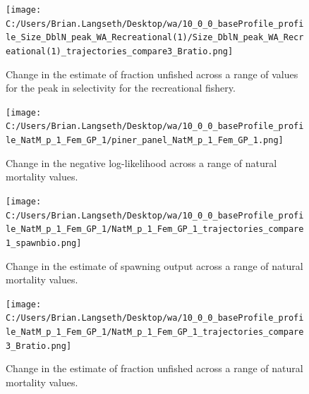 \documentclass[11pt,
  english,
  a4paper,
]{article}
\begin{document}
\begin{figure}
\centering
\texttt{[image: C:/Users/Brian.Langseth/Desktop/wa/10\_0\_0\_baseProfile\_profile\_Size\_DblN\_peak\_WA\_Recreational(1)/Size\_DblN\_peak\_WA\_Recreational(1)\_trajectories\_compare3\_Bratio.png]}
\caption{Change in the estimate of fraction unfished across a range of values for the peak in selectivity for the recreational fishery.\label{fig:recselex-depl}}
\end{figure}

\tagmcend\tagstructend


\begin{figure}
\centering
\texttt{[image: C:/Users/Brian.Langseth/Desktop/wa/10\_0\_0\_baseProfile\_profile\_NatM\_p\_1\_Fem\_GP\_1/piner\_panel\_NatM\_p\_1\_Fem\_GP\_1.png]}
\caption{Change in the negative log-likelihood across a range of natural mortality values.\label{fig:m-profile}}
\end{figure}

\tagmcend\tagstructend


\begin{figure}
\centering
\texttt{[image: C:/Users/Brian.Langseth/Desktop/wa/10\_0\_0\_baseProfile\_profile\_NatM\_p\_1\_Fem\_GP\_1/NatM\_p\_1\_Fem\_GP\_1\_trajectories\_compare1\_spawnbio.png]}
\caption{Change in the estimate of spawning output across a range of natural mortality values.\label{fig:m-ssb}}
\end{figure}

\tagmcend\tagstructend


\begin{figure}
\centering
\texttt{[image: C:/Users/Brian.Langseth/Desktop/wa/10\_0\_0\_baseProfile\_profile\_NatM\_p\_1\_Fem\_GP\_1/NatM\_p\_1\_Fem\_GP\_1\_trajectories\_compare3\_Bratio.png]}
\caption{Change in the estimate of fraction unfished across a range of natural mortality values.\label{fig:m-depl}}
\end{figure}

\tagmcend\tagstructend
\end{document}
